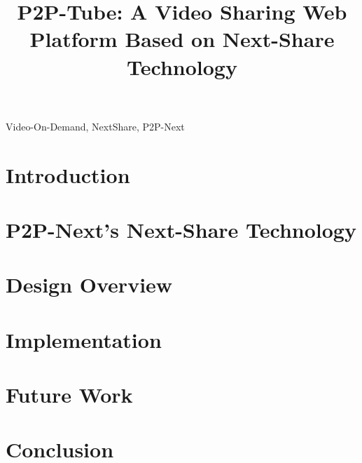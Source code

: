 \documentclass[conference]{IEEEtran}
\begin{document}
\title{P2P-Tube: A Video Sharing Web Platform Based on Next-Share Technology}

\author{
}

\maketitle

\begin{abstract}

\end{abstract}


\begin{IEEEkeywords}
Video-On-Demand, NextShare, P2P-Next
\end{IEEEkeywords}


\section{Introduction}
\label{sec:introduction}


\section{P2P-Next's Next-Share Technology}
\label{sec:next-share}


\section{Design Overview}
\label{sec:design}


\section{Implementation}
\label{sec:implementation}


\section{Future Work}
\label{sec:future-work}


\section{Conclusion}
\label{sec:conclusion}

\end{document}
